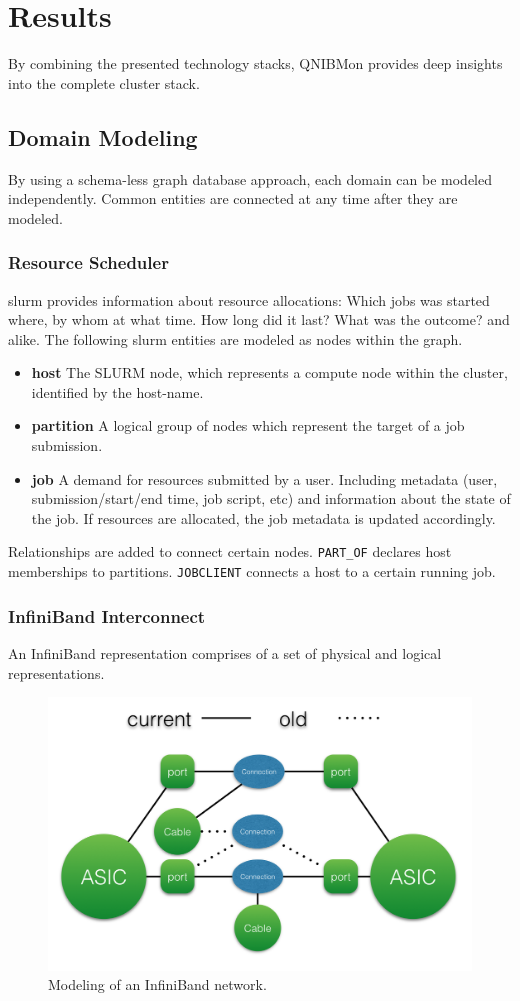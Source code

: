\section{Results}
By combining the presented technology stacks, QNIBMon provides deep insights into the complete cluster stack.

\subsection{Domain Modeling}
By using a schema-less graph database approach, each domain can be modeled independently. Common entities are connected at any time after
they are modeled.

\subsubsection{Resource Scheduler}
\gls{slurm} provides information about resource allocations: Which jobs was started where, by whom at what time. How long did it last? What was the outcome? and alike.
The following \gls{slurm} entities are modeled as nodes within the graph.
\begin{itemize}
    \item \textbf{host} The SLURM node, which represents a compute node within the cluster, identified by the host-name.
    \item \textbf{partition} A logical group of nodes which represent the target of a job submission.
    \item \textbf{job} A demand for resources submitted by a user. Including metadata (user, submission/start/end time, job script, etc) and information about the state of the job. If resources are allocated, the job metadata is updated accordingly.
\end{itemize}
Relationships are added to connect certain nodes. \lstinline{PART_OF} declares host memberships to partitions. \lstinline{JOBCLIENT} connects a host to a certain running job.

\subsubsection{InfiniBand Interconnect}
An InfiniBand representation comprises of a set of physical and logical representations.
\begin{figure}[!ht]
    \includegraphics[width=.4\textwidth]{images/png/infiniband_graph.png}
    \caption{\label{fig:ib_graph}Modeling of an InfiniBand network.}
\end{figure}

